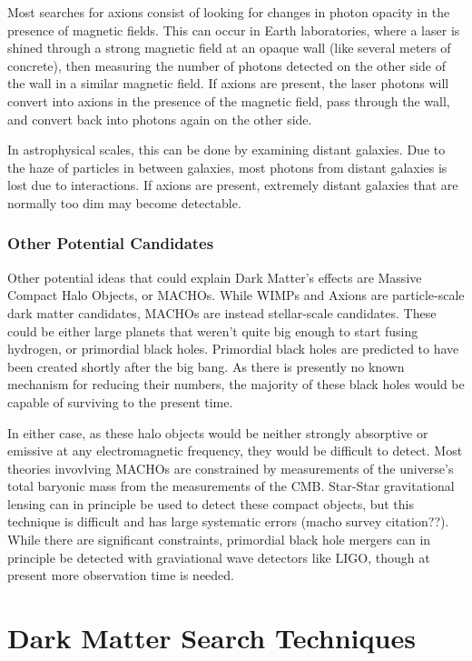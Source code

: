 Most searches for axions consist of looking for changes in photon opacity in the presence of magnetic fields.
This can occur in Earth laboratories, where a laser is shined through a strong magnetic field at an opaque wall (like several meters of concrete), then measuring the number of photons detected on the other side of the wall in a similar magnetic field.
If axions are present, the laser photons will convert into axions in the presence of the magnetic field, pass through the wall, and convert back into photons again on the other side.

In astrophysical scales, this can be done by examining distant galaxies.
Due to the haze of particles in between galaxies, most photons from distant galaxies is lost due to interactions.
If axions are present, extremely distant galaxies that are normally too dim may become detectable.


\subsubsection{Other Potential Candidates}

Other potential ideas that could explain Dark Matter's effects are Massive Compact Halo Objects, or MACHOs.
While WIMPs and Axions are particle-scale dark matter candidates, MACHOs are instead stellar-scale candidates.
These could be either large planets that weren't quite big enough to start fusing hydrogen, or primordial black holes.
Primordial black holes are predicted to have been created shortly after the big bang.
As there is presently no known mechanism for reducing their numbers, the majority of these black holes would be capable of surviving to the present time.

In either case, as these halo objects would be neither strongly absorptive or emissive at any electromagnetic frequency, they would be difficult to detect.
Most theories invovlving MACHOs are constrained by measurements of the universe's total baryonic mass from the measurements of the CMB.
Star-Star gravitational lensing can in principle be used to detect these compact objects, but this technique is difficult and has large systematic errors (macho survey citation??).
While there are significant constraints\cite{pbh_highly_constrained}, primordial black hole mergers can in principle be detected with graviational wave detectors like LIGO\cite{dm_with_ligo}, though at present more observation time is needed.



\section{Dark Matter Search Techniques}


